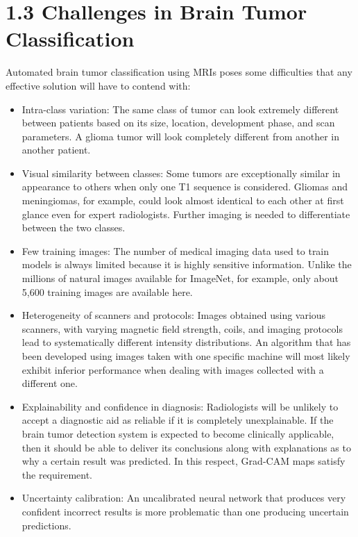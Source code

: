 \documentclass[12pt,a4paper,oneside]{report}
\begin{document}
\section*{1.3 Challenges in Brain Tumor Classification}
Automated brain tumor classification using MRIs poses some difficulties that any effective solution will have to contend with:
\begin{itemize}[leftmargin=*]
  \item Intra-class variation: The same class of tumor can look extremely different between patients based on its size, location, development phase, and scan parameters. A glioma tumor will look completely different from another in another patient.
  \item Visual similarity between classes: Some tumors are exceptionally similar in appearance to others when only one T1 sequence is considered. Gliomas and meningiomas, for example, could look almost identical to each other at first glance even for expert radiologists. Further imaging is needed to differentiate between the two classes.
  \item Few training images: The number of medical imaging data used to train models is always limited because it is highly sensitive information. Unlike the millions of natural images available for ImageNet, for example, only about 5,600 training images are available here.
  \item Heterogeneity of scanners and protocols: Images obtained using various scanners, with varying magnetic field strength, coils, and imaging protocols lead to systematically different intensity distributions. An algorithm that has been developed using images taken with one specific machine will most likely exhibit inferior performance when dealing with images collected with a different one.
  \item Explainability and confidence in diagnosis: Radiologists will be unlikely to accept a diagnostic aid as reliable if it is completely unexplainable. If the brain tumor detection system is expected to become clinically applicable, then it should be able to deliver its conclusions along with explanations as to why a certain result was predicted. In this respect, Grad-CAM maps satisfy the requirement.
  \item Uncertainty calibration: An uncalibrated neural network that produces very confident incorrect results is more problematic than one producing uncertain predictions.
\end{itemize}
\end{document}
